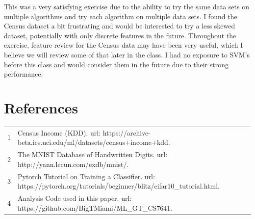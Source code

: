 \documentclass[letterpaper]{article} %
\begin{document}
This was a very satisfying exercise due to the ability to try the same data sets on multiple algorithms and try each algorithm on multiple data sets. I found the Census dataset a bit frustrating and would be interested to try a less skewed dataset, potentially with only discrete features in the future.  Throughout the exercise, feature review for the Census data may have been very useful, which I believe we will review some of that later in the class.  I had no exposure to SVM's before this class and would consider them in the future due to their strong performance.  

\section{References}
\begin{tabular}{l p{2.75in}}
\\
1 & Census Income (KDD). url: https://archive-beta.ics.uci.edu/ml/datasets/census+income+kdd.
\\
2 & The MNIST Database of Handwritten Digits. url: http://yann.lecun.com/exdb/mnist/.
\\
3 & Pytorch Tutorial on Training a Classifier. url: https://pytorch.org/tutorials/beginner/blitz/cifar10\_tutorial.html.
\\
4 & Analysis Code used in this paper. url: https://github.com/BigTMiami/ML\_GT\_CS7641.

\end{tabular}
\end{document}
